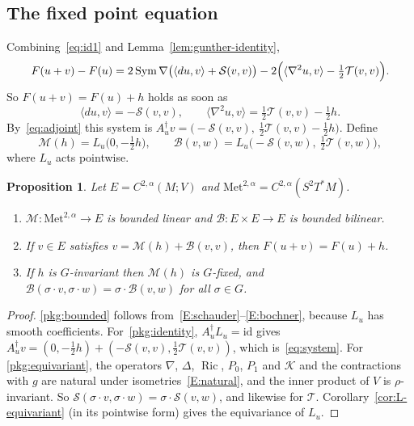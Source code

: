\documentclass[11pt]{amsart}
\newtheorem{proposition}[theorem]{Proposition}
\theoremstyle{definition}
\newcommand{\Met}{\mathrm{Met}}
\newcommand{\Sym}{\operatorname{Sym}}
\newcommand{\Ric}{\operatorname{Ric}}
\newcommand{\inner}[2]{\langle #1, #2\rangle}
\newcommand{\cM}{\mathcal{M}}
\newcommand{\cB}{\mathcal{B}}
\newcommand{\cS}{\mathcal{S}}
\newcommand{\cT}{\mathcal{T}}
\newcommand{\cK}{\mathcal{K}}
\begin{document}
\subsection{The fixed point equation}
Combining~\eqref{eq:id1} and Lemma~\ref{lem:gunther-identity},
\[
F(u+v)-F(u) = 2\Sym\nabla\bigl(\inner{du}{v}+\cS(v,v)\bigr)
-2\Bigl(\inner{\nabla^2u}{v}-\tfrac12\cT(v,v)\Bigr).
\]
So $F(u+v)=F(u)+h$ holds as soon as
\begin{equation}\label{eq:system}
\inner{du}{v} = -\cS(v,v),\qquad
\inner{\nabla^2u}{v} = \tfrac12\cT(v,v)-\tfrac12h .
\end{equation}
By~\eqref{eq:adjoint} this system is $A_u^\dagger v=\bigl(-\cS(v,v),\ \tfrac12\cT(v,v)-\tfrac12h\bigr)$.
Define
\[
\cM(h) = L_u\bigl(0,-\tfrac12h\bigr),\qquad
\cB(v,w) = L_u\bigl(-\cS(v,w),\ \tfrac12\cT(v,w)\bigr),
\]
where $L_u$ acts pointwise.

\begin{proposition}\label{prop:gunther-package}
Let $E=C^{2,\alpha}(M;V)$ and $\Met^{2,\alpha}=C^{2,\alpha}(S^2T^*M)$.
\begin{enumerate}[label=(\alph*)]
\item\label{pkg:bounded} $\cM\colon\Met^{2,\alpha}\to E$ is bounded linear and
$\cB\colon E\times E\to E$ is bounded bilinear.
\item\label{pkg:identity} If $v\in E$ satisfies $v=\cM(h)+\cB(v,v)$, then $F(u+v)=F(u)+h$.
\item\label{pkg:equivariant} If $h$ is $G$-invariant then $\cM(h)$ is $G$-fixed, and
$\cB(\sigma\cdot v,\sigma\cdot w)=\sigma\cdot\cB(v,w)$ for all $\sigma\in G$.
\end{enumerate}
\end{proposition}

\begin{proof}
\ref{pkg:bounded} follows from~\ref{E:schauder}--\ref{E:bochner}, because $L_u$ has smooth
coefficients. For~\ref{pkg:identity}, $A_u^\dagger L_u=\mathrm{id}$ gives
$A_u^\dagger v = (0,-\tfrac12h)+(-\cS(v,v),\tfrac12\cT(v,v))$, which is~\eqref{eq:system}. For
\ref{pkg:equivariant}, the operators $\nabla$, $\Delta$, $\Ric$, $P_0$, $P_1$ and $\cK$ and the
contractions with $g$ are natural under isometries~\ref{E:natural}, and the inner product of $V$
is $\rho$-invariant. So $\cS(\sigma\cdot v,\sigma\cdot w)=\sigma\cdot\cS(v,w)$, and likewise for
$\cT$. Corollary~\ref{cor:L-equivariant} (in its pointwise form) gives the equivariance of $L_u$.
\end{proof}
\end{document}
